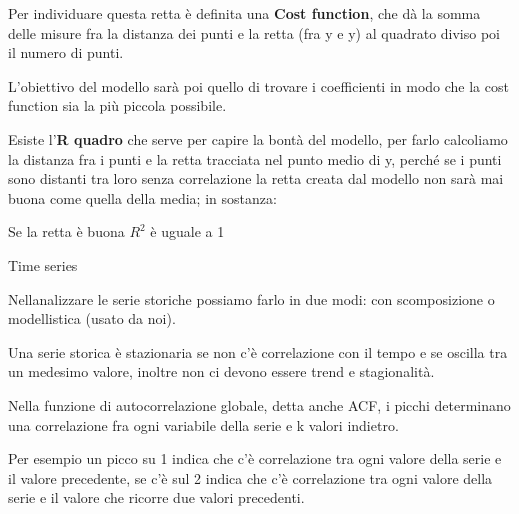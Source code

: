 Per individuare questa retta è definita una \textbf{Cost function}, che
dà la somma delle misure fra la distanza dei punti e la retta (fra y e
y) al quadrato diviso poi il numero di punti.

L'obiettivo del modello sarà poi quello di trovare i coefficienti in
modo che la cost function sia la più piccola possibile.

Esiste l'\textbf{R quadro} che serve per capire la bontà del modello,
per farlo calcoliamo la distanza fra i punti e la retta tracciata nel
punto medio di y, perché se i punti sono distanti tra loro senza
correlazione la retta creata dal modello non sarà mai buona come quella
della media; in sostanza:

Se la retta è buona \(R^{2}\) è uguale a 1

Time series

Nell\textquotesingle analizzare le serie storiche possiamo farlo in due
modi: con scomposizione o modellistica (usato da noi).

Una serie storica è stazionaria se non c'è correlazione con il tempo e
se oscilla tra un medesimo valore, inoltre non ci devono essere trend e
stagionalità.

Nella funzione di autocorrelazione globale, detta anche ACF, i picchi
determinano una correlazione fra ogni variabile della serie e k valori
indietro.

Per esempio un picco su 1 indica che c'è correlazione tra ogni valore
della serie e il valore precedente, se c'è sul 2 indica che c'è
correlazione tra ogni valore della serie e il valore che ricorre due
valori precedenti.
